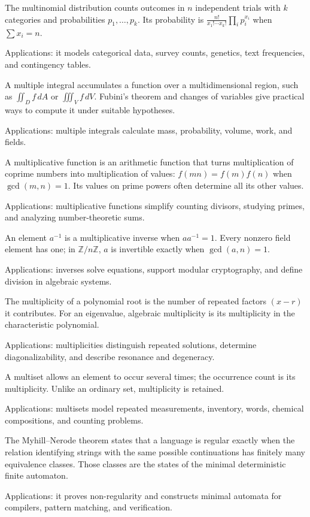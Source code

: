 The multinomial distribution counts outcomes in $n$ independent trials with $k$ categories and probabilities $p_1,\ldots,p_k$. Its probability is $\frac{n!}{x_1!\cdots x_k!}\prod_i p_i^{x_i}$ when $\sum x_i=n$. \par\noindent Applications: it models categorical data, survey counts, genetics, text frequencies, and contingency tables.

A multiple integral accumulates a function over a multidimensional region, such as $\iint_Df\,dA$ or $\iiint_Vf\,dV$. Fubini's theorem and changes of variables give practical ways to compute it under suitable hypotheses. \par\noindent Applications: multiple integrals calculate mass, probability, volume, work, and fields.

A multiplicative function is an arithmetic function that turns multiplication of coprime numbers into multiplication of values: $f(mn)=f(m)f(n)$ when $\gcd(m,n)=1$. Its values on prime powers often determine all its other values. \par\noindent Applications: multiplicative functions simplify counting divisors, studying primes, and analyzing number-theoretic sums.

An element $a^{-1}$ is a multiplicative inverse when $aa^{-1}=1$. Every nonzero field element has one; in $\mathbb Z/n\mathbb Z$, $a$ is invertible exactly when $\gcd(a,n)=1$. \par\noindent Applications: inverses solve equations, support modular cryptography, and define division in algebraic systems.

The multiplicity of a polynomial root is the number of repeated factors $(x-r)$ it contributes. For an eigenvalue, algebraic multiplicity is its multiplicity in the characteristic polynomial. \par\noindent Applications: multiplicities distinguish repeated solutions, determine diagonalizability, and describe resonance and degeneracy.

A multiset allows an element to occur several times; the occurrence count is its multiplicity. Unlike an ordinary set, multiplicity is retained. \par\noindent Applications: multisets model repeated measurements, inventory, words, chemical compositions, and counting problems.

The Myhill--Nerode theorem states that a language is regular exactly when the relation identifying strings with the same possible continuations has finitely many equivalence classes. Those classes are the states of the minimal deterministic finite automaton. \par\noindent Applications: it proves non-regularity and constructs minimal automata for compilers, pattern matching, and verification.
